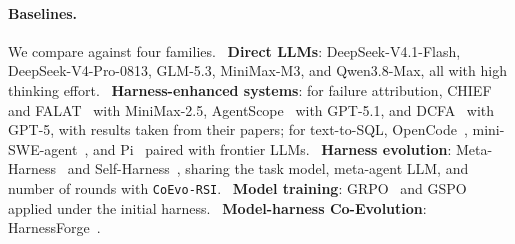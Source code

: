 \documentclass[11pt,a4paper]{article}
\newcommand{\ourmethod}{\texttt{CoEvo-RSI}}
\begin{document}
\paragraph{Baselines.}
We compare against four families. ~\textbf{Direct LLMs}: DeepSeek-V4.1-Flash, DeepSeek-V4-Pro-0813, GLM-5.3, MiniMax-M3, and Qwen3.8-Max, all with high thinking effort. ~\textbf{Harness-enhanced systems}: for failure attribution, CHIEF~\citep{wang2026chief} and FALAT~\citep{rafi2026falat} with MiniMax-2.5, AgentScope~\citep{bi2026agentscope} with GPT-5.1, and DCFA~\citep{dcfa2026} with GPT-5, with results taken from their papers; for text-to-SQL, OpenCode~\citep{anomaly2025opencode}, mini-SWE-agent~\citep{yang2024sweagent}, and Pi~\citep{zechner2025pi} paired with frontier LLMs. ~\textbf{Harness evolution}: Meta-Harness~\citep{lee2026metaharness} and Self-Harness~\citep{zhang2026selfharness}, sharing the task model, meta-agent LLM, and number of rounds with \ourmethod{}. ~\textbf{Model training}: GRPO~\citep{shao2024grpo} and GSPO~\citep{zheng2025gspo} applied under the initial harness. ~\textbf{Model-harness Co-Evolution}: HarnessForge~\citep{chen2026harnessforge}. 
\end{document}
